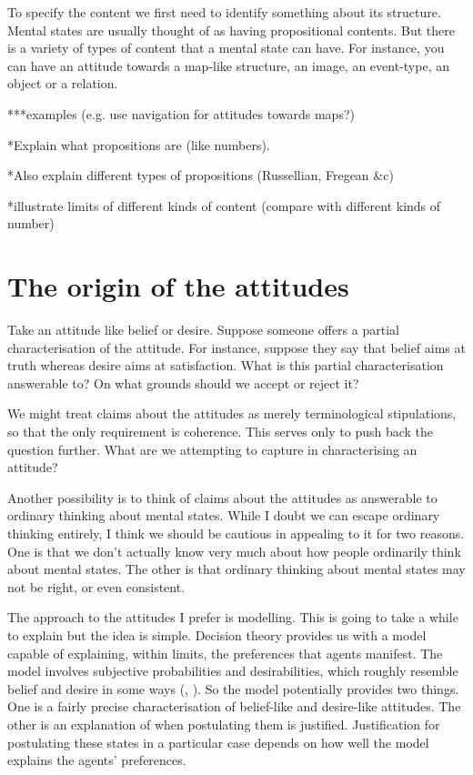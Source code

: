 \documentclass[12pt,\papersize]{extarticle}
\begin{document}
To specify the content we first need to identify something about its structure.
Mental states are usually thought of as having propositional contents.
But there is a variety of types of content that a mental state can have.
For instance, you can have an attitude towards a map-like structure, an image, an event-type, an object or a relation.

***examples (e.g. use navigation for attitudes towards maps?)

*Explain what propositions are (like numbers).  

*Also explain different types of propositions (Russellian, Fregean \&c)

*illustrate limits of different kinds of content (compare with different kinds of number)


\section{The origin of the attitudes}

Take an attitude like belief or desire.
Suppose someone offers a partial characterisation of the attitude.
For instance, 
suppose they say that belief aims at truth whereas desire aims at satisfaction.
What is this partial characterisation answerable to?
On what grounds should we accept or reject it?

We might treat claims about the attitudes as merely terminological stipulations, so that the only requirement is coherence.
This serves only to push back the question further.
What are we attempting to capture in characterising an attitude?  

Another possibility is to think of claims about the attitudes as answerable to ordinary thinking about mental states.
While I doubt we can escape ordinary thinking entirely, I think we should be cautious in appealing to it for two reasons.
One is that we don't actually know very much about how people ordinarily think about mental states.
The other is that ordinary thinking about mental states may not be right, or even consistent.

The approach to the attitudes I prefer is modelling.
This is going to take a while to explain but the idea is simple.
Decision theory provides us with a model capable of explaining, within limits, the preferences that agents manifest.
The model involves subjective probabilities and desirabilities, which roughly resemble belief and desire in some ways (\citealp[p.\ 59]{Jeffrey:1983oe}, \citealp{Davidson:1985qg}). 
So the model potentially provides two things.
One is a fairly precise characterisation of belief-like and desire-like attitudes.
The other is an explanation of when postulating them is justified.
Justification for postulating these states in a particular case depends on how well the model explains the agents' preferences.
\end{document}

